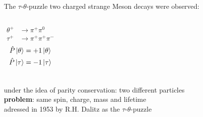 \documentclass[aspectratio=1610, 10pt]{beamer}
\begin{document}
\begin{frame}{The $\tau$-$\theta$-puzzle}
	two charged strange Meson decays were observed:\\
	\vspace{0.2cm}
	\begin{columns}
		\begin{align*}
			\theta^+ &\rightarrow \pi^+ \pi^0\\
			\tau^+ &\rightarrow \pi^+ \pi^+ \pi^-
		\end{align*}
		\begin{align*}
			\hat{P}\ket{\theta} &= +1\ket{\theta}\\
			\hat{P}\ket{\tau} &= -1\ket{\tau}\\
		\end{align*}
	\end{columns}
	\vspace{0.2cm}
	\textrightarrow under the idea of parity conservation: two different particles\\
	\vspace{0.5cm}
	\textbf{problem}: same spin, charge, mass and lifetime\\
	adressed in 1953 by R.H. Dalitz as the $\tau$-$\theta$-puzzle \cite{doi:10.1080/14786441008520365}
\end{frame}
\end{document}

